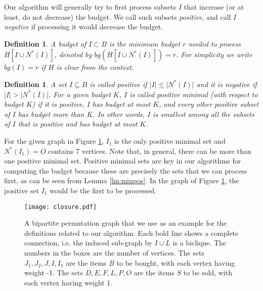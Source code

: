 \documentclass[letterpaper,11pt,abstracton]{scrartcl}
\newtheorem{dfn}[theorem]{Definition}
\begin{document}
Our algorithm will generally try to first process subsets $I$ that
increase (or at least, do not decrease) the budget.  We call such
subsets \emph{positive}, and call $I$ \emph{negative} if processing it
would decrease the budget.

\begin{dfn}\label{def:budget-for-prime}
  A budget of $I \subset B$ is the minimum budget $r$ needed to process $H[I \cup N^*(I)]$, denoted by  $bg(H[I\cup N^*(I)])=r$.
  For simplicity we write $bg(I)=r$ if $H$ is clear from the context.
\end{dfn}

\begin{dfn}\label{def:positive} A set
  $I \subseteq B$ is called \emph{positive} if $\vert I\vert \leq \vert
  N^{*}(I)\vert$ and it is \emph{negative} if $\vert I\vert > \vert
  N^{*}(I)\vert$.
  For a given budget $K$, $I$ is called \emph{positive minimal} (with respect to budget $K$) if it is positive, $I$ has budget at most
  $K$,  and every other positive  subset of $I$ has budget more than $K$. In
  other words, $I$ is  smallest among all the subsets of $I$ that is positive and has
  budget at most $K$.
\end{dfn}

For the given graph in Figure \ref{fig:2}, $I_1$ is the only positive minimal set and $N^*(I_1)=O$ contains $7$ vertices. Note that, in general, there can be more than one positive minimal set.
Positive minimal sets are key in our algorithms for computing the budget
because these are precisely the sets that we can process
first, as can be seen from Lemma \ref{lm:minpos}.  In the graph of Figure \ref{fig:2}, the positive set $I_1$
would be the first to be processed.

\begin{figure}[htbp]
\begin{center}
\texttt{[image: closure.pdf]}
\caption{ A bipartite permutation graph that we use as an example for
    the definitions related to our algorithm.  Each bold line shows a
    complete connection, i.e. the induced sub-graph by $I \cup L$ is a biclique. The numbers in
    the boxes are the number of vertices.  The sets $J_1, J_2, J, I, I_1$
    are the items $B$ to be bought, with each vertex having weight
    -1.  The sets $D, E, F, L, P, O$ are the items $S$ to be sold,
    with each vertex having weight 1. }
\label{fig:2}
\end{center}
\end{figure}
\end{document}
